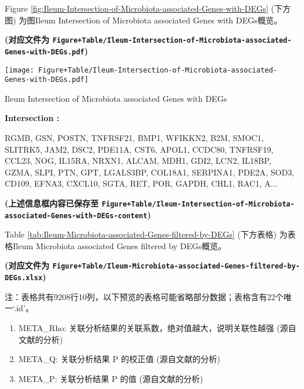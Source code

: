 \documentclass[
]{article}
\providecommand{\tightlist}{%
  \setlength{\itemsep}{0pt}\setlength{\parskip}{0pt}}
\begin{document}
Figure \ref{fig:Ileum-Intersection-of-Microbiota-associated-Genes-with-DEGs} (下方图) 为图Ileum Intersection of Microbiota associated Genes with DEGs概览。

\textbf{(对应文件为 \texttt{Figure+Table/Ileum-Intersection-of-Microbiota-associated-Genes-with-DEGs.pdf})}

\def\@captype{figure}
\begin{center}
\texttt{[image: Figure+Table/Ileum-Intersection-of-Microbiota-associated-Genes-with-DEGs.pdf]}
\caption{Ileum Intersection of Microbiota associated Genes with DEGs}\label{fig:Ileum-Intersection-of-Microbiota-associated-Genes-with-DEGs}
\end{center}
\begin{center}\begin{tcolorbox}[colback=gray!10, colframe=gray!50, width=0.9\linewidth, arc=1mm, boxrule=0.5pt]
\textbf{
Intersection
:}

\vspace{0.5em}

    RGMB, GSN, POSTN, TNFRSF21, BMP1, WFIKKN2, B2M, SMOC1,
SLITRK5, JAM2, DSC2, PDE11A, CST6, APOL1, CCDC80, TNFRSF19,
CCL23, NOG, IL15RA, NRXN1, ALCAM, MDH1, GDI2, LCN2, IL18BP,
GZMA, SLPI, PTN, GPT, LGALS3BP, COL18A1, SERPINA1, PDE2A,
SOD3, CD109, EFNA3, CXCL10, SGTA, RET, POR, GAPDH, CHL1,
RAC1, A...

\vspace{2em}
\end{tcolorbox}
\end{center}

\textbf{(上述信息框内容已保存至 \texttt{Figure+Table/Ileum-Intersection-of-Microbiota-associated-Genes-with-DEGs-content})}

Table \ref{tab:Ileum-Microbiota-associated-Genes-filtered-by-DEGs} (下方表格) 为表格Ileum Microbiota associated Genes filtered by DEGs概览。

\textbf{(对应文件为 \texttt{Figure+Table/Ileum-Microbiota-associated-Genes-filtered-by-DEGs.xlsx})}

\begin{center}\begin{tcolorbox}[colback=gray!10, colframe=gray!50, width=0.9\linewidth, arc=1mm, boxrule=0.5pt]注：表格共有9208行10列，以下预览的表格可能省略部分数据；表格含有22个唯一`.id'。
\end{tcolorbox}
\end{center}
\begin{center}\begin{tcolorbox}[colback=gray!10, colframe=gray!50, width=0.9\linewidth, arc=1mm, boxrule=0.5pt]\begin{enumerate}\tightlist
\item META\_Rho:  关联分析结果的关联系数，绝对值越大，说明关联性越强 (源自文献的分析)
\item META\_Q:  关联分析结果 P 的校正值 (源自文献的分析)
\item META\_P:  关联分析结果 P 的值 (源自文献的分析)
\end{enumerate}\end{tcolorbox}
\end{center}
\end{document}
